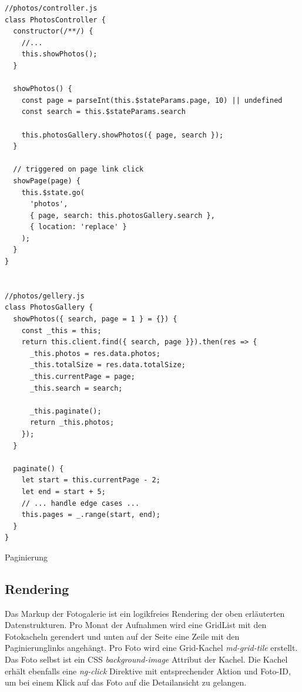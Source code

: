 \begin{listing}[H]
\begin{verbatim}
//photos/controller.js
class PhotosController {
  constructor(/**/) {
    //...
    this.showPhotos();
  }

  showPhotos() {
    const page = parseInt(this.$stateParams.page, 10) || undefined
    const search = this.$stateParams.search

    this.photosGallery.showPhotos({ page, search });
  }

  // triggered on page link click
  showPage(page) {
    this.$state.go(
      'photos',
      { page, search: this.photosGallery.search },
      { location: 'replace' }
    );
  }
}


//photos/gellery.js
class PhotosGallery {
  showPhotos({ search, page = 1 } = {}) {
    const _this = this;
    return this.client.find({ search, page }}).then(res => {
      _this.photos = res.data.photos;
      _this.totalSize = res.data.totalSize;
      _this.currentPage = page;
      _this.search = search;

      _this.paginate();
      return _this.photos;
    });
  }

  paginate() {
    let start = this.currentPage - 2;
    let end = start + 5;
    // ... handle edge cases ...
    this.pages = _.range(start, end);
  }
}

\end{verbatim}
\caption{Paginierung}
\label{lst:pagination}
\end{listing}

\subsection{Rendering}
\label{sec:rendering}

Das Markup der Fotogalerie ist ein logikfreies Rendering der oben erläuterten Datenstrukturen. Pro Monat der Aufnahmen wird eine GridList mit den Fotokacheln gerendert und unten auf der Seite eine Zeile mit den Paginierunglinks angehängt.
Pro Foto wird eine Grid-Kachel \emph{md-grid-tile} erstellt. Das Foto selbst ist ein CSS \emph{background-image} Attribut der Kachel. Die Kachel erhält ebenfalls eine \emph{ng-click} Direktive mit entsprechender Aktion und Foto-ID, um bei einem Klick auf das Foto auf die Detailansicht zu gelangen.

